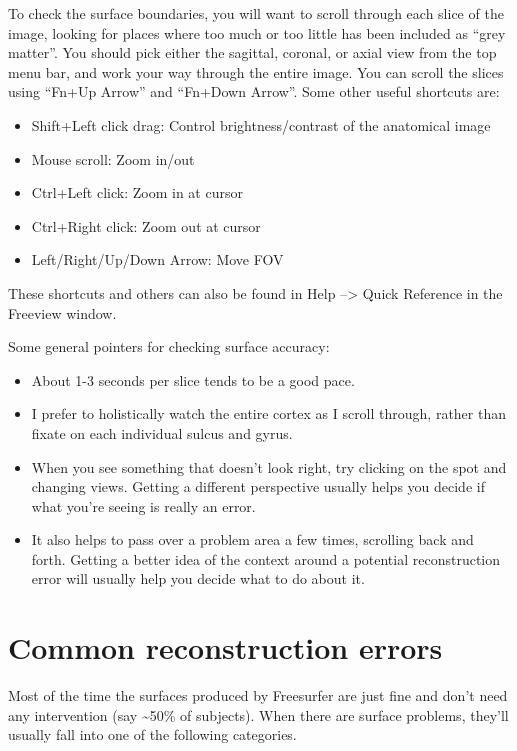 \documentclass[letterpaper,10pt,openany,oneside]{sphinxmanual}
\begin{document}
To check the surface boundaries, you will want to scroll through each slice of
the image, looking for places where too much or too little has been included as
``grey matter''. You should pick either the sagittal, coronal, or axial view from
the top menu bar, and work your way through the entire image. You can scroll
the slices using ``Fn+Up Arrow'' and ``Fn+Down Arrow''. Some other useful shortcuts
are:
\begin{itemize}
\item {} 
Shift+Left click drag: Control brightness/contrast of the anatomical image

\item {} 
Mouse scroll: Zoom in/out

\item {} 
Ctrl+Left click: Zoom in at cursor

\item {} 
Ctrl+Right click: Zoom out at cursor

\item {} 
Left/Right/Up/Down Arrow: Move FOV

\end{itemize}

These shortcuts and others can also be found in Help --\textgreater{} Quick Reference in
the Freeview window.

Some general pointers for checking surface accuracy:
\begin{itemize}
\item {} 
About 1-3 seconds per slice tends to be a good pace.

\item {} 
I prefer to holistically watch the entire cortex as I scroll through, rather
than fixate on each individual sulcus and gyrus.

\item {} 
When you see something that doesn't look right, try clicking on the spot and
changing views. Getting a different perspective usually helps you decide if
what you're seeing is really an error.

\item {} 
It also helps to pass over a problem area a few times, scrolling back and
forth. Getting a better idea of the context around a potential reconstruction
error will usually help you decide what to do about it.

\end{itemize}


\section{Common reconstruction errors}
\label{surface_reconstruction:common-reconstruction-errors}\label{surface_reconstruction:id1}
Most of the time the surfaces produced by Freesurfer are just fine and don't
need any intervention (say \textasciitilde{}50\% of subjects). When there are surface
problems, they'll usually fall into one of the following categories.
\end{document}
